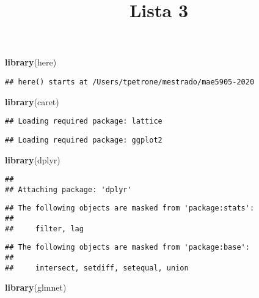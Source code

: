 \documentclass[]{article}
\title{Lista 3}
\author{}
\date{\vspace{-2.5em}}
\newenvironment{Shaded}{\begin{snugshade}}{\end{snugshade}}
\newcommand{\KeywordTok}[1]{\textcolor[rgb]{0.13,0.29,0.53}{\textbf{#1}}}
\newcommand{\NormalTok}[1]{#1}
\begin{document}
\maketitle

\begin{Shaded}
\begin{Highlighting}[]
\KeywordTok{library}\NormalTok{(here)}
\end{Highlighting}
\end{Shaded}

\begin{verbatim}
## here() starts at /Users/tpetrone/mestrado/mae5905-2020
\end{verbatim}

\begin{Shaded}
\begin{Highlighting}[]
\KeywordTok{library}\NormalTok{(caret)}
\end{Highlighting}
\end{Shaded}

\begin{verbatim}
## Loading required package: lattice
\end{verbatim}

\begin{verbatim}
## Loading required package: ggplot2
\end{verbatim}

\begin{Shaded}
\begin{Highlighting}[]
\KeywordTok{library}\NormalTok{(dplyr)}
\end{Highlighting}
\end{Shaded}

\begin{verbatim}
## 
## Attaching package: 'dplyr'
\end{verbatim}

\begin{verbatim}
## The following objects are masked from 'package:stats':
## 
##     filter, lag
\end{verbatim}

\begin{verbatim}
## The following objects are masked from 'package:base':
## 
##     intersect, setdiff, setequal, union
\end{verbatim}

\begin{Shaded}
\begin{Highlighting}[]
\KeywordTok{library}\NormalTok{(glmnet)}
\end{Highlighting}
\end{Shaded}
\end{document}
